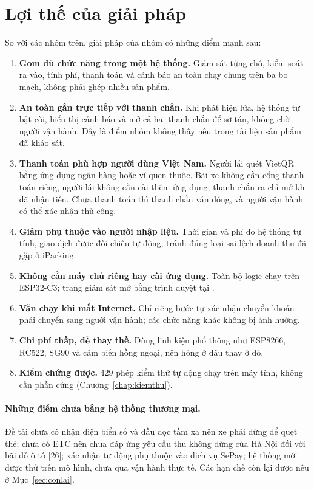 \section{Lợi thế của giải pháp}\label{sec:loithe}
So với các nhóm trên, giải pháp của nhóm có những điểm mạnh sau:
\begin{enumerate}
  \item \textbf{Gom đủ chức năng trong một hệ thống.} Giám sát từng chỗ, kiểm soát ra vào,
        tính phí, thanh toán và cảnh báo an toàn chạy chung trên ba bo mạch, không phải ghép
        nhiều sản phẩm.
  \item \textbf{An toàn gắn trực tiếp với thanh chắn.} Khi phát hiện lửa, hệ thống tự bật
        còi, hiển thị cảnh báo và mở cả hai thanh chắn để sơ tán, không chờ người vận hành.
        Đây là điểm nhóm không thấy nêu trong tài liệu sản phẩm đã khảo sát.
  \item \textbf{Thanh toán phù hợp người dùng Việt Nam.} Người lái quét VietQR bằng ứng dụng
        ngân hàng hoặc ví quen thuộc. Bãi xe không cần cổng thanh toán riêng, người lái không
        cần cài thêm ứng dụng; thanh chắn ra chỉ mở khi đã nhận tiền. Chưa thanh toán thì
        thanh chắn vẫn đóng, và người vận hành có thể xác nhận thủ công.
  \item \textbf{Giảm phụ thuộc vào người nhập liệu.} Thời gian và phí do hệ thống tự tính,
        giao dịch được đối chiếu tự động, tránh đúng loại sai lệch doanh thu đã gặp ở iParking.
  \item \textbf{Không cần máy chủ riêng hay cài ứng dụng.} Toàn bộ logic chạy trên ESP32-C3;
        trang giám sát mở bằng trình duyệt tại .
  \item \textbf{Vẫn chạy khi mất Internet.} Chỉ riêng bước tự xác nhận chuyển khoản phải
        chuyển sang người vận hành; các chức năng khác không bị ảnh hưởng.
  \item \textbf{Chi phí thấp, dễ thay thế.} Dùng linh kiện phổ thông như ESP8266, RC522,
        SG90 và cảm biến hồng ngoại, nên hỏng ở đâu thay ở đó.
  \item \textbf{Kiểm chứng được.} 429 phép kiểm thử tự động chạy trên máy tính, không cần
        phần cứng (Chương~\ref{chap:kiemthu}).
\end{enumerate}

\paragraph{Những điểm chưa bằng hệ thống thương mại.} Đề tài chưa có nhận diện biển số và đầu
đọc tầm xa nên xe phải dừng để quẹt thẻ; chưa có ETC nên chưa đáp ứng yêu cầu thu không
dừng của Hà Nội đối với bãi đỗ ô tô [26]; xác nhận tự động phụ thuộc vào dịch vụ SePay; hệ
thống mới được thử trên mô hình, chưa qua vận hành thực tế. Các hạn chế còn lại được nêu ở
Mục~\ref{sec:conlai}.
